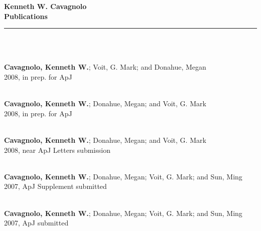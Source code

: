 \documentclass[11pt]{cv}
\begin{document}
\begin{center}
{\huge \textbf{\sc Kenneth W. Cavagnolo\\ \large Publications}}\\
\rule{17.35cm}{1pt}\\
\end{center}
\normalsize

\begin{llist}



{}\\
{\bf Cavagnolo, Kenneth W.}; Voit, G. Mark; and Donahue, Megan\\
2008, in prep. for ApJ

{}\\
{\bf Cavagnolo, Kenneth W.}; Donahue, Megan; and Voit, G. Mark\\
2008, in prep. for ApJ

{}\\
{\bf Cavagnolo, Kenneth W.}; Donahue, Megan; and Voit, G. Mark\\
2008, near ApJ Letters submission

{}\\
{\bf Cavagnolo, Kenneth W.}; Donahue, Megan; Voit, G. Mark; and Sun, Ming\\
2007, ApJ Supplement submitted

{}\\
{\bf Cavagnolo, Kenneth W.}; Donahue, Megan; Voit, G. Mark; and Sun, Ming\\
2007, ApJ submitted




\end{llist}
\end{document}
